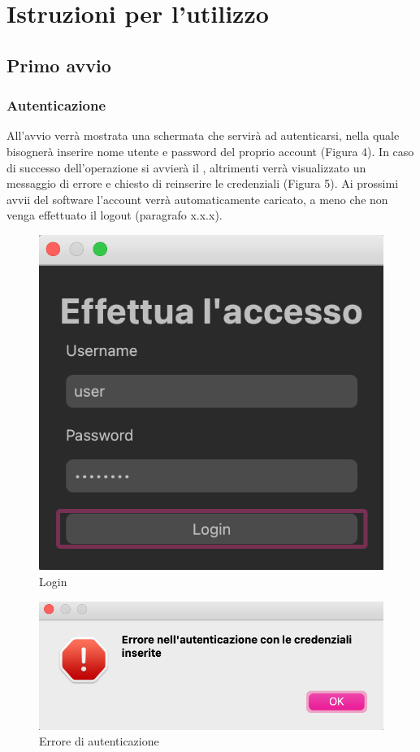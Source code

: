 \section{Istruzioni per l'utilizzo}

\subsection{Primo avvio}
\subsubsection{Autenticazione}
\label{sec:autenticazione}
All'avvio verrà mostrata una schermata che servirà ad autenticarsi, nella quale bisognerà inserire nome utente e password del proprio account  (Figura 4). In caso di successo dell'operazione si avvierà il , altrimenti verrà visualizzato un messaggio di errore e chiesto di reinserire le credenziali (Figura 5).  \newline
Ai prossimi avvii del software l'account verrà automaticamente caricato, a meno che non venga effettuato il logout (paragrafo x.x.x).
\begin{figure}[H]
    \centering
    \includegraphics[scale = 0.50]{components/img/login.png}
    \caption{Login}
    \label{fig:Vista del login}
\end{figure}
\begin{figure}[H]
    \centering
    \includegraphics[scale = 0.50]{components/img/err-login.png}
    \caption{Errore di autenticazione}
    \label{fig:Vista del login}
\end{figure}
